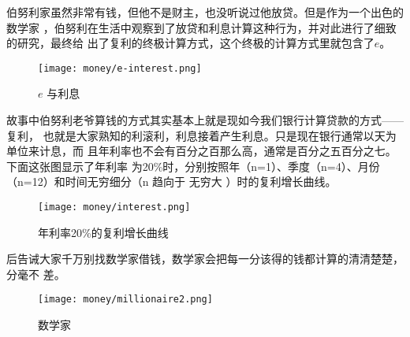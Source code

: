 伯努利家虽然非常有钱，但他不是财主，也没听说过他放贷。但是作为一个出色的数学家
，伯努利在生活中观察到了放贷和利息计算这种行为，并对此进行了细致的研究，最终给
出了复利的终极计算方式，这个终极的计算方式里就包含了$e$。

\begin{figure}[htbp]
\centering
\texttt{[image: money/e-interest.png]}
\caption{$ e$ 与利息}
\centering
\end{figure}

故事中伯努利老爷算钱的方式其实基本上就是现如今我们银行计算贷款的方式——复利，
也就是大家熟知的利滚利，利息接着产生利息。只是现在银行通常以天为单位来计息，而
且年利率也不会有百分之百那么高，通常是百分之五百分之七。下面这张图显示了年利率
为20\%时，分别按照年（n=1）、季度（n=4）、月份（n=12）和时间无穷细分（n 趋向于
无穷大 ）时的复利增长曲线。

\begin{figure}[htbp]
\centering
\texttt{[image: money/interest.png]}
\caption{年利率20\%的复利增长曲线}
\centering
\end{figure}


后告诫大家千万别找数学家借钱，数学家会把每一分该得的钱都计算的清清楚楚，分毫不
差。

\begin{figure}[htbp]
\centering
\texttt{[image: money/millionaire2.png]}
\caption{数学家}
\centering
\end{figure}


